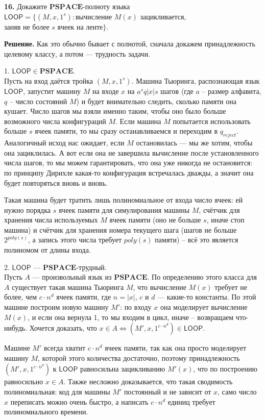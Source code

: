 \textbf{16.} Докажите $\textbf{PSPACE}$-полноту языка $\mathsf{LOOP} = \{(M ,x, 1^s)\colon \text{вычисление $M(x)$ зацикливается,}$\\$\text{заняв не более $s$ ячеек на ленте}\}$.

\textbf{Решение.} Как это обычно бывает с полнотой, сначала докажем принадлежность целевому классу, а потом --- трудность задачи.

1. $\mathsf{LOOP} \in \mathbf{PSPACE}$.\\
Пусть на вход даётся тройка $(M, x, 1^s)$. Машина Тьюринга, распознающая язык $\mathsf{LOOP}$, запустит машину $M$ на входе $x$ на $a^{s}q|x|s$ шагов (где $a$ -- размер алфавита, $q$ -- число состояний $M$) и будет внимательно следить, сколько памяти она кушает. Число шагов мы взяли именно таким, чтобы оно было больше возможного числа конфигураций $M$. Если машина $M$ попытается использовать больше $s$ ячеек памяти, то мы сразу останавливаемся и переходим в $q_{reject}$. Аналогичный исход нас ожидает, если $M$ остановилась --- мы же хотим, чтобы она зациклилась. А вот если она не завершила вычисление после установленного числа шагов, то мы можем гарантировать, что она уже никогда не остановится: по принципу Дирихле какая-то конфигурация встречалась дважды, а значит она будет повторяться вновь и вновь.

Такая машина будет тратить лишь полиномиальное от входа число ячеек: ей нужно порядка $s$ ячеек памяти для симулирования машины $M$, счётчик для хранения числа используемых $M$ ячеек памяти (оно не больше $s$, иначе стоп машина) и счётчик для хранения номера текущего шага (шагов не больше $2^{poly(s)}$, а запись этого числа требует $poly(s)$ памяти) -- всё это является полиномом от длины входа.

2. $\mathsf{LOOP}$ --- $\mathbf{PSPACE}$-трудный.\\
Пусть $A$ --- произвольный язык из $\mathbf{PSPACE}$. По определению этого класса для $A$ существует такая машина Тьюринга $M$, что вычисление $M(x)$ требует не более, чем $c\cdot n^d$ ячеек памяти, где $n = |x|$, $c$ и $d$ --- какие-то константы. По этой машине построим новую машину $M'$: по входу $x$ она моделирует вычисление $M(x)$, и если она вернула 1, то мы входим в цикл, иначе -- возвращаем что-нибудь. Хочется доказать, что $x \in A \Longleftrightarrow (M', x, 1^{c\cdot n^d}) \in \mathsf{LOOP}$.

Машине $M'$ всегда хватит $c\cdot n^d$ ячеек памяти, так как она просто моделирует машину $M$, которой этого количества достаточно, поэтому принадлежность $(M', x, 1^{c\cdot n^d})$ к $\mathsf{LOOP}$ равносильна зацикливанию $M'(x)$, что по построению равносильно $x \in A$. Также несложно доказывается, что такая сводимость полиномиальная: код для машины $M'$ постоянный и не зависит от $x$, само число $x$ переписать можно очень быстро, а написать $c\cdot n^d$ единиц требует полиномиального времени.